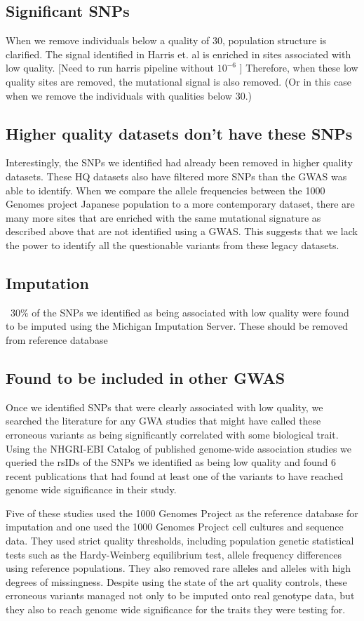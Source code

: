 \documentclass[12pt]{amsart}
\begin{document}
\subsection{Significant SNPs}
When we remove individuals below a quality of 30, population structure is clarified. 
The signal identified in Harris et. al is enriched in sites associated with low quality. [Need to run harris pipeline without $10^{-6}$ ]
Therefore, when these low quality sites are removed, the mutational signal is also removed. (Or in this case when we remove the individuals with qualities below 30.)

\subsection{Higher quality datasets don't have these SNPs}

Interestingly, the SNPs we identified had already been removed in higher quality datasets. 
These HQ datasets also have filtered more SNPs than the GWAS was able to identify. 
When we compare the allele frequencies between the 1000 Genomes project Japanese population to a more contemporary dataset, there are many more sites that are enriched with the same mutational signature as described above that are not identified using a GWAS. 
This suggests that we lack the power to identify all the questionable variants from these legacy datasets. 
\subsection{Imputation}
~30\% of the SNPs we identified as being associated with low quality were found to be imputed using the Michigan Imputation Server. These  should be removed from reference database

\subsection{Found to be included in other GWAS}
Once we identified SNPs that were clearly associated with low quality, we searched the literature for any GWA studies that might have called these erroneous variants as being significantly correlated with some biological trait. 
Using the NHGRI-EBI Catalog of published genome-wide association studies we queried the rsIDs of the SNPs we identified as being low quality and found 6 recent publications that had found at least one of the variants to have reached genome wide significance in their study. 

Five of these studies used the 1000 Genomes Project as the reference database for imputation and one used the 1000 Genomes Project cell cultures and sequence data. 
They used strict quality thresholds, including population genetic statistical tests such as the Hardy-Weinberg equilibrium test, allele frequency differences using reference populations. 
They also removed rare alleles and alleles with high degrees of missingness. 
Despite using the state of the art quality controls, these erroneous variants managed not only to be imputed onto real genotype data, but they also to reach genome wide significance for the traits they were testing for. 
\end{document}
